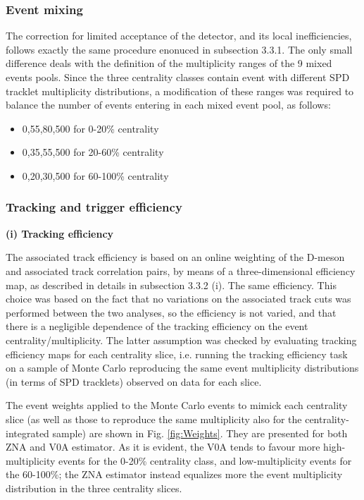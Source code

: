 \subsubsection{Event mixing}
The correction for limited acceptance of the detector, and its local inefficiencies, follows exactly the same procedure enonuced in subsection 3.3.1.
The only small difference deals with the definition of the multiplicity ranges of the 9 mixed events pools. Since the three centrality classes contain event with different SPD tracklet multiplicity distributions, a modification of these ranges was required to balance the number of events entering in each mixed event pool, as follows:
\begin{itemize}
  \item {0,55,80,500} for 0-20\% centrality
  \item {0,35,55,500} for 20-60\% centrality
  \item {0,20,30,500} for 60-100\% centrality
\end{itemize}

\subsubsection{Tracking and trigger efficiency}

{\bf (i) Tracking efficiency}

The associated track efficiency is based on an online weighting of the D-meson and associated track correlation pairs, by means of a three-dimensional efficiency map, as described in details in subsection 3.3.2 (i).
The same efficiency.
This choice was based on the fact that no variations on the associated track cuts was performed between the two analyses, so the efficiency is not varied, and that there is a negligible dependence of the tracking efficiency on the event centrality/multiplicity.
The latter assumption was checked by evaluating tracking efficiency maps for each centrality slice, i.e. running the tracking efficiency task on a sample of Monte Carlo reproducing the same event multiplicity distributions (in terms of SPD tracklets) observed on data for each slice.

The event weights applied to the Monte Carlo events to mimick each centrality slice (as well as those to reproduce the same multiplicity also for the centrality-integrated sample) are shown in Fig. \ref{fig:Weights}. They are presented for both ZNA and V0A estimator. As it is evident, the V0A tends to favour more high-multiplicity events for the 0-20\% centrality class, and low-multiplicity events for the 60-100\%; the ZNA estimator instead equalizes more the event multiplicity distribution in the three centrality slices.

